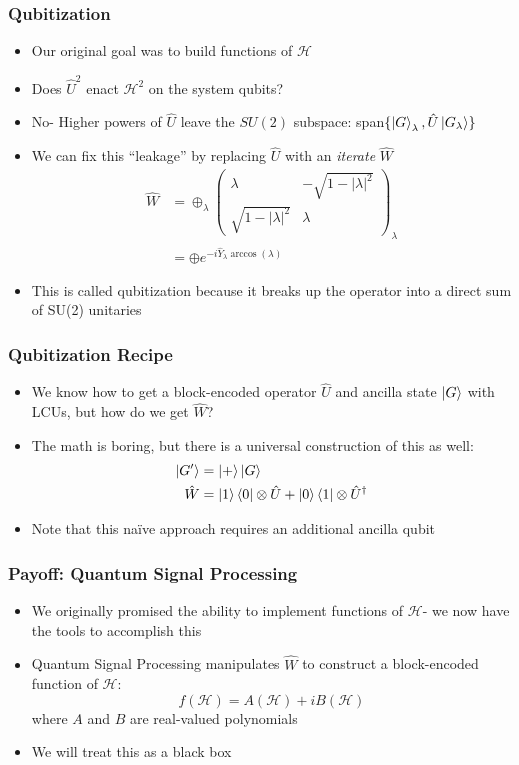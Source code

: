 \documentclass[aspectratio=169]{beamer}
\begin{document}
\begin{frame}
	\frametitle{Qubitization}
	\begin{itemize}[<+->]
	\item Our original goal was to build functions of $\mathcal{H}$
	\item Does $\hat{U}^2$ enact $\mathcal{H}^2$ on the system qubits?
	\item No- Higher powers of $\hat{U}$ leave the $SU(2)$ subspace: span$\{\ket{G}_\lambda,\hat{U}\ket{G_\lambda}\}$
	\item We can fix this ``leakage'' by replacing $\hat{U}$ with an \textit{iterate} $\hat{W}$
		\begin{align}
			\nonumber \hat{W}&=\oplus_{\lambda}\begin{pmatrix} \lambda & -\sqrt{1-|\lambda|^2} \\ \sqrt{1-|\lambda|^2} & \lambda\end{pmatrix}_\lambda\\
		\nonumber &=\oplus e^{-i\hat{Y}_\lambda \arccos(\lambda)}
		\end{align}
	\item This is called qubitization because it breaks up the operator into a direct sum of SU(2) unitaries
	\end{itemize}
\end{frame}

\begin{frame}
	\frametitle{Qubitization Recipe}
	\begin{itemize}[<+->]
		\item We know how to get a block-encoded operator $\hat{U}$ and ancilla state $\ket{G}$ with LCUs, but how do we get $\hat{W}$?
	\item The math is boring, but there is a universal construction of this as well:
	\begin{align}
		\nonumber \ket{G'} &= \ket{+}\ket{G}\\
		\nonumber \hat{W} &= \ket{1}\bra{0}\otimes\hat{U} + \ket{0}\bra{1}\otimes\hat{U}^{\dagger}
	\end{align}
	\item Note that this na{\"i}ve approach requires an additional ancilla qubit
	\end{itemize}
\end{frame}

\begin{frame}
	\frametitle{Payoff: Quantum Signal Processing }
	\begin{itemize}[<+->]
	\item We originally promised the ability to implement functions of $\mathcal{H}$- we now have the tools to accomplish this
	\item Quantum Signal Processing manipulates $\hat{W}$ to construct a block-encoded function of $\mathcal{H}$:
	\begin{equation}\nonumber
	f(\mathcal{H}) = A(\mathcal{H})+iB(\mathcal{H})
	\end{equation}
	where $A$ and $B$ are real-valued polynomials
	\item We will treat this as a black box
	\end{itemize}
\end{frame}
\end{document}
